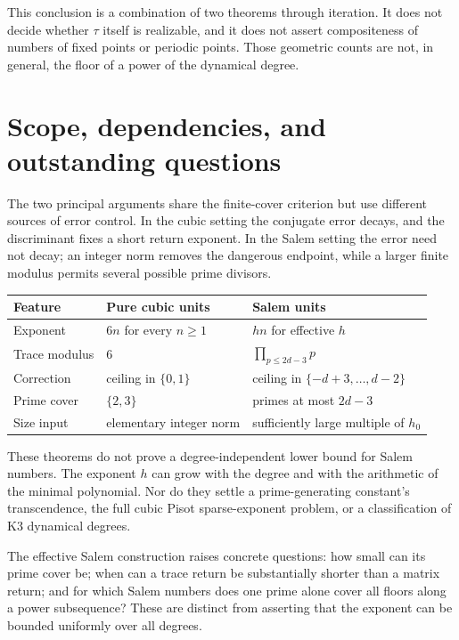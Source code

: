 \documentclass[11pt,a4paper]{article}
\theoremstyle{definition}\newtheorem{definition}[theorem]{Definition}
\theoremstyle{remark}\newtheorem{remark}[theorem]{Remark}
\begin{document}
This conclusion is a combination of two theorems through iteration. It does not decide whether $\tau$ itself is realizable, and it does not assert compositeness of numbers of fixed points or periodic points. Those geometric counts are not, in general, the floor of a power of the dynamical degree.

\section{Scope, dependencies, and outstanding questions}
The two principal arguments share the finite-cover criterion but use different sources of error control. In the cubic setting the conjugate error decays, and the discriminant fixes a short return exponent. In the Salem setting the error need not decay; an integer norm removes the dangerous endpoint, while a larger finite modulus permits several possible prime divisors.

\begin{center}
\begin{tabular}{p{}p{}p{}}
\toprule
Feature & Pure cubic units & Salem units\\
\midrule
Exponent & $6n$ for every $n\ge1$ & $hn$ for effective $h$\\
Trace modulus & $6$ & $\prod_{p\le2d-3}p$\\
Correction & ceiling in $\{0,1\}$ & ceiling in $\{-d+3,\ldots,d-2\}$\\
Prime cover & $\{2,3\}$ & primes at most $2d-3$\\
Size input & elementary integer norm & sufficiently large multiple of $h_0$\\
\bottomrule
\end{tabular}
\end{center}

These theorems do not prove a degree-independent lower bound for Salem numbers. The exponent $h$ can grow with the degree and with the arithmetic of the minimal polynomial. Nor do they settle a prime-generating constant's transcendence, the full cubic Pisot sparse-exponent problem, or a classification of K3 dynamical degrees.

The effective Salem construction raises concrete questions: how small can its prime cover be; when can a trace return be substantially shorter than a matrix return; and for which Salem numbers does one prime alone cover all floors along a power subsequence? These are distinct from asserting that the exponent can be bounded uniformly over all degrees.
\end{document}
